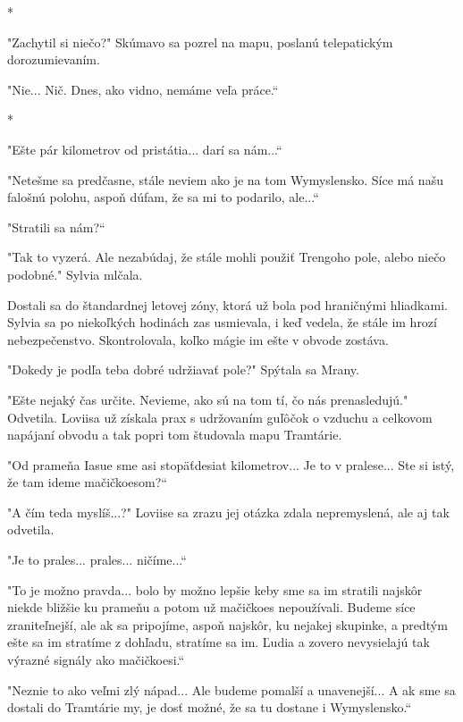 \documentclass{book}
\begin{document}
\begin{center}

*

\end{center}

"$ $Zachytil si niečo?"$ $ Skúmavo sa pozrel na mapu, poslanú telepatickým dorozumievaním.

"$ $Nie... Nič. Dnes, ako vidno, nemáme veľa práce.“

\begin{center}

*

\end{center}

"$ $Ešte pár kilometrov od pristátia... darí sa nám...“

"$ $Netešme sa predčasne, stále neviem ako je na tom Wymyslensko. Síce má našu falošnú polohu, aspoň dúfam, že sa mi to podarilo, ale...“

"$ $Stratili sa nám?“

"$ $Tak to vyzerá. Ale nezabúdaj, že stále mohli použiť Trengoho pole, alebo niečo podobné."$ $ Sylvia mlčala.

Dostali sa do štandardnej letovej zóny, ktorá už bola pod hraničnými hliadkami. Sylvia sa po niekoľkých hodinách zas usmievala, i keď vedela, že stále im hrozí nebezpečenstvo. Skontrolovala, koľko mágie im ešte v obvode zostáva.

"$ $Dokedy je podľa teba dobré udržiavať pole?"$ $ Spýtala sa Mrany.

"$ $Ešte nejaký čas určite. Nevieme, ako sú na tom tí, čo nás prenasledujú."$ $ Odvetila. Loviisa už získala prax s udržovaním guľôčok o vzduchu a celkovom napájaní obvodu a tak popri tom študovala mapu Tramtárie.

"$ $Od prameňa Iasue sme asi stopäťdesiat kilometrov... Je to v pralese... Ste si istý, že tam ideme mačičkoesom?“

"$ $A čím teda myslíš...?"$ $ Loviise sa zrazu jej otázka zdala nepremyslená, ale aj tak odvetila.

"$ $Je to prales... prales... ničíme...“

"$ $To je možno pravda... bolo by možno lepšie keby sme sa im stratili najskôr niekde bližšie ku prameňu a potom už mačičkoes nepoužívali. Budeme síce zraniteľnejší, ale ak sa pripojíme, aspoň najskôr, ku nejakej skupinke, a predtým ešte sa im stratíme z dohľadu, stratíme sa im. Ľudia a zovero nevysielajú tak výrazné signály ako mačičkoesi.“

"$ $Neznie to ako veľmi zlý nápad... Ale budeme pomalší a unavenejší... A ak sme sa dostali do Tramtárie my, je dosť možné, že sa tu dostane i Wymyslensko.“
\end{document}
